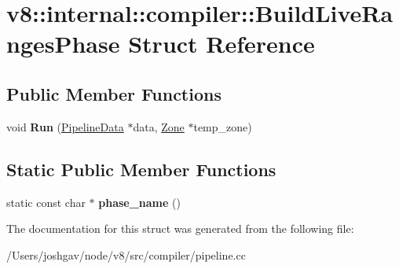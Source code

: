 \hypertarget{structv8_1_1internal_1_1compiler_1_1_build_live_ranges_phase}{}\section{v8\+:\+:internal\+:\+:compiler\+:\+:Build\+Live\+Ranges\+Phase Struct Reference}
\label{structv8_1_1internal_1_1compiler_1_1_build_live_ranges_phase}
\subsection*{Public Member Functions}
\begin{DoxyCompactItemize}
\item 
void {\bfseries Run} (\hyperlink{classv8_1_1internal_1_1compiler_1_1_pipeline_data}{Pipeline\+Data} $\ast$data, \hyperlink{classv8_1_1internal_1_1_zone}{Zone} $\ast$temp\+\_\+zone)\hypertarget{structv8_1_1internal_1_1compiler_1_1_build_live_ranges_phase_ac147364f6efa83b678b0e3307c2aff9f}{}\label{structv8_1_1internal_1_1compiler_1_1_build_live_ranges_phase_ac147364f6efa83b678b0e3307c2aff9f}

\end{DoxyCompactItemize}
\subsection*{Static Public Member Functions}
\begin{DoxyCompactItemize}
\item 
static const char $\ast$ {\bfseries phase\+\_\+name} ()\hypertarget{structv8_1_1internal_1_1compiler_1_1_build_live_ranges_phase_a67d99c9c44f44b70454409fb8146a498}{}\label{structv8_1_1internal_1_1compiler_1_1_build_live_ranges_phase_a67d99c9c44f44b70454409fb8146a498}

\end{DoxyCompactItemize}


The documentation for this struct was generated from the following file\+:\begin{DoxyCompactItemize}
\item 
/\+Users/joshgav/node/v8/src/compiler/pipeline.\+cc\end{DoxyCompactItemize}
